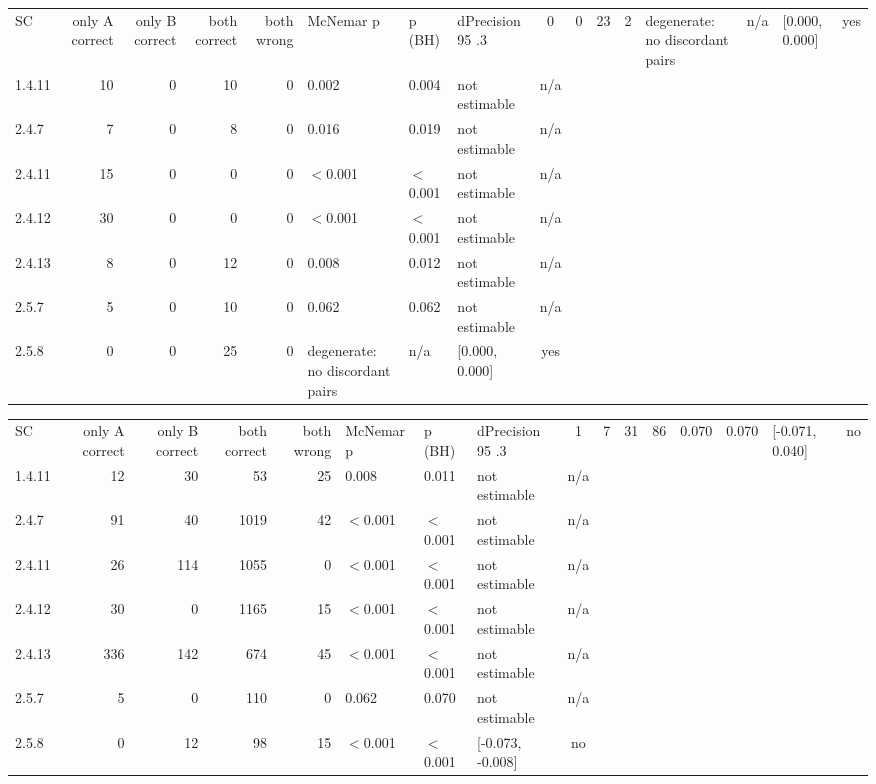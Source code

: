 \begin{tabular}{lrrrrlllc}
\hline
SC & only A correct & only B correct & both correct & both wrong & McNemar p & p (BH) & dPrecision 95%
.3 & 0 & 0 & 23 & 2 & degenerate: no discordant pairs & n/a & [0.000, 0.000] & yes \\
1.4.11 & 10 & 0 & 10 & 0 & 0.002 & 0.004 & not estimable & n/a \\
2.4.7 & 7 & 0 & 8 & 0 & 0.016 & 0.019 & not estimable & n/a \\
2.4.11 & 15 & 0 & 0 & 0 & $<$0.001 & $<$0.001 & not estimable & n/a \\
2.4.12 & 30 & 0 & 0 & 0 & $<$0.001 & $<$0.001 & not estimable & n/a \\
2.4.13 & 8 & 0 & 12 & 0 & 0.008 & 0.012 & not estimable & n/a \\
2.5.7 & 5 & 0 & 10 & 0 & 0.062 & 0.062 & not estimable & n/a \\
2.5.8 & 0 & 0 & 25 & 0 & degenerate: no discordant pairs & n/a & [0.000, 0.000] & yes \\
\hline
\end{tabular}

\begin{tabular}{lrrrrlllc}
\hline
SC & only A correct & only B correct & both correct & both wrong & McNemar p & p (BH) & dPrecision 95%
.3 & 1 & 7 & 31 & 86 & 0.070 & 0.070 & [-0.071, 0.040] & no \\
1.4.11 & 12 & 30 & 53 & 25 & 0.008 & 0.011 & not estimable & n/a \\
2.4.7 & 91 & 40 & 1019 & 42 & $<$0.001 & $<$0.001 & not estimable & n/a \\
2.4.11 & 26 & 114 & 1055 & 0 & $<$0.001 & $<$0.001 & not estimable & n/a \\
2.4.12 & 30 & 0 & 1165 & 15 & $<$0.001 & $<$0.001 & not estimable & n/a \\
2.4.13 & 336 & 142 & 674 & 45 & $<$0.001 & $<$0.001 & not estimable & n/a \\
2.5.7 & 5 & 0 & 110 & 0 & 0.062 & 0.070 & not estimable & n/a \\
2.5.8 & 0 & 12 & 98 & 15 & $<$0.001 & $<$0.001 & [-0.073, -0.008] & no \\
\hline
\end{tabular}

